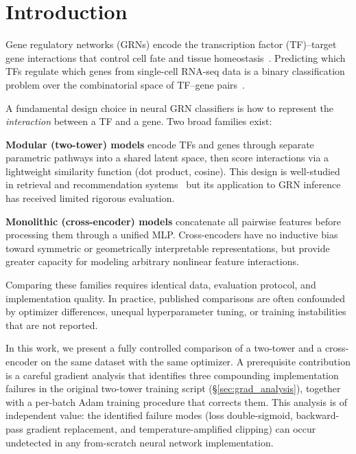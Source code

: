 \documentclass[10pt,twocolumn]{article}
\begin{document}
\vspace{0.5em}

\section{Introduction}
\label{sec:introduction}

Gene regulatory networks (GRNs) encode the transcription factor (TF)--target
gene interactions that control cell fate and tissue homeostasis~\cite{davidson2002genomic,barabasi2004network}.
Predicting which TFs regulate which genes from single-cell RNA-seq data is a
binary classification problem over the combinatorial space of TF--gene
pairs~\cite{pratapa2020benchmarking,chen2019evaluating}.

A fundamental design choice in neural GRN classifiers is how to represent the
\emph{interaction} between a TF and a gene.
Two broad families exist:

\textbf{Modular (two-tower) models} encode TFs and genes through separate
parametric pathways into a shared latent space, then score interactions via a
lightweight similarity function (dot product, cosine).
This design is well-studied in retrieval and recommendation
systems~\cite{yi2019sampling} but its application to GRN inference has received
limited rigorous evaluation.

\textbf{Monolithic (cross-encoder) models} concatenate all pairwise features
before processing them through a unified MLP.
Cross-encoders have no inductive bias toward symmetric or geometrically
interpretable representations, but provide greater capacity for modeling
arbitrary nonlinear feature interactions.

Comparing these families requires identical data, evaluation protocol, and
implementation quality.
In practice, published comparisons are often confounded by optimizer differences,
unequal hyperparameter tuning, or training instabilities that are not reported.

In this work, we present a fully controlled comparison of a two-tower and a
cross-encoder on the same dataset with the same optimizer.
A prerequisite contribution is a careful gradient analysis that identifies three
compounding implementation failures in the original two-tower training script
(\S\ref{sec:grad_analysis}), together with a per-batch Adam training procedure
that corrects them.
This analysis is of independent value: the identified failure modes (loss
double-sigmoid, backward-pass gradient replacement, and temperature-amplified
clipping) can occur undetected in any from-scratch neural network implementation.
\end{document}
